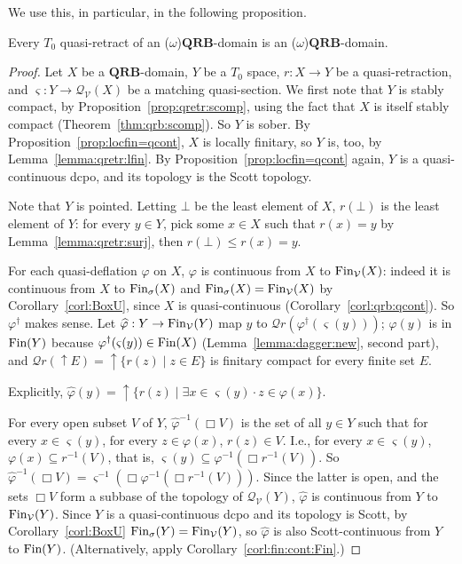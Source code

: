 \documentclass{LMCS}
\newcommand\Smyth{\mathcal Q}
\newcommand\V{{\mathcal V}}
\newcommand\SV{\Smyth_\V}
\newcommand\upc{\mathop{\uparrow}\nolimits}
\newcommand\QRB{\mathbf{QRB}}
\newcommand\qs{\varsigma}
\begin{document}
We use this, in particular, in the following proposition.
\begin{prop}
  \label{prop:qretr:qrb}
  Every $T_0$ quasi-retract of an ($\omega$)$\QRB$-domain is an
  ($\omega$)$\QRB$-domain.
\end{prop}
\begin{proof}
  Let $X$ be a $\QRB$-domain, $Y$ be a $T_0$ space, $r : X \to Y$ be a
  quasi-retraction, and $\qs : Y \to \SV (X)$ be a matching
  quasi-section.  We first note that $Y$ is stably compact, by
  Proposition~\ref{prop:qretr:scomp}, using the fact that $X$ is
  itself stably compact (Theorem~\ref{thm:qrb:scomp}).  So $Y$ is
  sober. By Proposition~\ref{prop:locfin=qcont}, $X$ is locally finitary, so
  $Y$ is, too, by Lemma~\ref{lemma:qretr:lfin}.  By
  Proposition~\ref{prop:locfin=qcont} again, $Y$ is a quasi-continuous
  dcpo, and its topology is the Scott topology.

  Note that $Y$ is pointed.  Letting $\bot$ be the least element of
  $X$, $r (\bot)$ is the least element of $Y$: for every $y \in Y$,
  pick some $x \in X$ such that $r (x) = y$ by
  Lemma~\ref{lemma:qretr:surj}, then $r (\bot) \leq r (x) = y$.

  For each quasi-deflation $\varphi$ on $X$, $\varphi$ is continuous
  from $X$ to $\Fin_\V (X)$: indeed it is continuous from $X$ to
  $\mathop{\text{Fin}}_\sigma (X)$ and $\Fin_\sigma (X) = \Fin_\V (X)$ by
  Corollary~\ref{corl:BoxU}, since $X$ is quasi-continuous
  (Corollary~\ref{corl:qrb:qcont}).  So $\varphi^\dagger$ makes sense.
  Let $\widehat\varphi : Y \to \Fin_\V (Y)$ map $y$ to $\Smyth r
  (\varphi^\dagger (\qs (y)))$; $\widehat\varphi (y)$ is in $\mathop{\text{Fin}} (Y)$
  because $\varphi^\dagger (\qs (y)) \in \Fin (X)$
  (Lemma~\ref{lemma:dagger:new}, second part), and $\Smyth r (\upc E)
  = \upc \{r (z) \mid z \in E\}$ is finitary compact for every finite
  set $E$.

  Explicitly, $\widehat\varphi (y) = \upc \{r (z) \mid \exists x \in
  \qs (y) \cdot z \in \varphi (x)\}$.


  For every open subset $V$ of $Y$, $\widehat\varphi^{-1} (\Box V)$ is
  the set of all $y \in Y$ such that for every $x \in \qs (y)$, for
  every $z \in \varphi (x)$, $r (z) \in V$.  I.e., for every $x \in
  \qs (y)$, $\varphi (x) \subseteq r^{-1} (V)$, that is, $\qs (y)
  \subseteq \varphi^{-1} (\Box r^{-1} (V))$.  So $\widehat\varphi^{-1}
  (\Box V) = \qs^{-1} (\Box \varphi^{-1} (\Box r^{-1} (V)))$.  Since
  the latter is open, and the sets $\Box V$ form a subbase of the
  topology of $\SV (Y)$, $\widehat\varphi$ is continuous from $Y$ to
  $\Fin_\V (Y)$.  Since $Y$ is a quasi-continuous dcpo and its
  topology is Scott, by Corollary~\ref{corl:BoxU} $\Fin_\sigma (Y) =
  \Fin_\V (Y)$, so $\widehat\varphi$ is also Scott-continuous from $Y$
  to $\mathop{\text{Fin}} (Y)$.  (Alternatively, apply Corollary~\ref{corl:fin:cont:Fin}.)


\end{proof}
\end{document}
